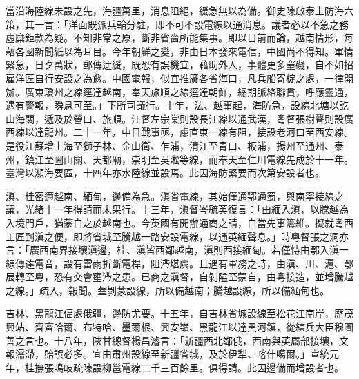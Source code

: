 \begin{pinyinscope}
當沿海陸線未設之先，海疆萬里，消息阻絕，緩急無以為備。御史陳啟泰上防海六策，其一言：「洋面既派兵輪分駐，即不可不設電線以通消息。議者必以不急之務虛糜鉅款為疑。不知非常之原，斷非省嗇所能集事。即以目前而論，越南情形，每藉各國新聞紙以為耳目。今年朝鮮之變，非由日本發來電信，中國尚不得知。軍情緊急，日夕萬狀，郵傳迂緩，既恐有誤機宜，藉助外人，事體更多窒礙，自不如招雇洋匠自行安設之為愈。中國電報，似宜推廣各省海口，凡兵船寄椗之處，一律開辦。廣東瓊州之線逕達越南，奉天旅順之線逕達朝鮮，總期脈絡聯貫，呼應靈通，遇有警報，瞬息可至。」下所司議行。十年，法、越事起，海防急，設線北塘以訖山海關，遞及於營口、旅順。江督左宗棠則設長江線以通武漢，粵督張樹聲則設廣西線以達龍州。二十一年，中日戰事亟，慮直東一線有阻，接設老河口至西安線。是役江蘇增上海至獅子林、金山衛、乍浦，清江至青口、板浦，揚州至通州、泰州，鎮江至圌山關、天都廟，崇明至吳淞等線，而奉天至仁川電線先成於十一年。臺灣以瀕海要區，十四年亦水陸線並設焉。此因海防緊要而次第安設者也。

滇、桂密邇越南、緬甸，邊備為急。滇省電線，其始僅通鄂通蜀，與南寧接線之議，光緒十一年得請而未果行。十三年，滇督岑毓英復言：「由緬入滇，以騰越為入境門戶，猶蒙自之於越南也。今英國有開辦通商之請，自當先事籌維。擬就粵西工匠到滇之便，即將省城至騰越一路安設電線，以通英緬聲息。」時粵督張之洞亦言：「廣西南界接壤滇邊，桂、滇皆西鄰越南，滇則西接緬甸。若僅恃由鄂入滇一線傳達電音，設有雷雨折斷電桿，阻滯堪虞。且遇有軍務之時，由滇、川、滬、鄂展轉至粵，恐有交會壅滯之患。已商之滇督，自剝隘至蒙自，由粵接造，並增騰越之線。」疏入，報聞。蓋剝蒙設線，所以備越南；騰越設線，所以備緬甸也。

吉林、黑龍江偪處俄疆，邊防尤要。十五年，自吉林省城設線至松花江南岸，歷茂興站、齊齊哈爾、布特哈、墨爾根、興安嶺、黑龍江以達黑河鎮，從練兵大臣穆圖善之言也。十八年，陜甘總督楊昌濬言：「新疆西北鄰俄，西南與英屬部接壤，文報濡滯，貽誤必多。宜由肅州設線至新疆省城，及於伊犁、喀什噶爾。」宣統元年，桂撫張鳴岐疏陳設柳邕電線二千三百餘里。俱得請。此因邊備而增設者也。


\end{pinyinscope}
